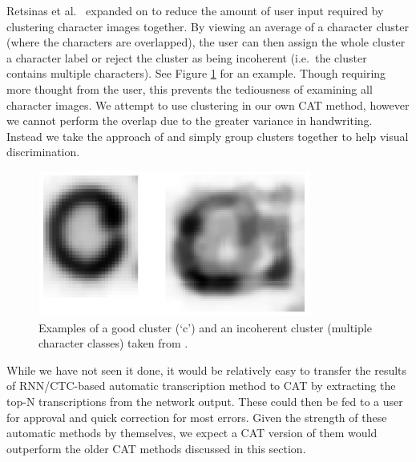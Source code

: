 \documentclass[ms,electronic,twosidetoc,letterpaper,chaptercenter,parttop,lof,lot]{byumsphd}
\begin{document}
Retsinas et al.~\cite{Retsinas2015} expanded on \cite{Neudecker2010} to reduce the amount of user input required by clustering character images together. By viewing an average of a character cluster (where the characters are overlapped), the user can then assign the whole cluster a character label or reject the cluster as being incoherent (i.e.~the cluster contains multiple characters). See Figure \ref{fig:retsinas_ex} for an example. Though requiring more thought from the user, this prevents the tediousness of examining all character images. %
We attempt to use clustering in our own CAT method, however we cannot perform the overlap due to the greater variance in handwriting. Instead we take the approach of \cite{Clawson2014} and simply group clusters together to help visual discrimination.

\begin{figure}
    \centering
    \includegraphics[width=.4\textwidth]{retsinas_ex}
    \caption{Examples of a good cluster (`c') and an incoherent cluster (multiple character classes) taken from \cite{Retsinas2015}.}
    \label{fig:retsinas_ex}
\end{figure}

While we have not seen it done, it would be relatively easy to transfer the results of RNN/CTC-based automatic transcription method to CAT by extracting the top-N transcriptions from the network output. These could then be fed to a user for approval and quick correction for most errors. Given the strength of these automatic methods by themselves, we expect a CAT version of them would outperform the older CAT methods discussed in this section. 




\end{document}
